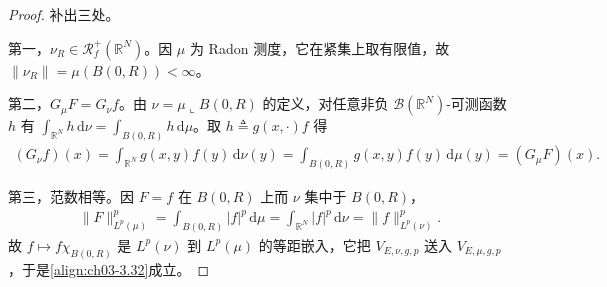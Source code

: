 \documentclass[../../main.tex]{subfiles}%
\begin{document}
\begin{proof}
补出三处。

第一，$\nu_R\in\mathscr{R}^+_f(\mathbb{R}^N)$。因 $\mu$ 为 Radon 测度，它在紧集上取有限值，故 $\|\nu_R\|=\mu(B(0,R))<\infty$。

第二，$G_\mu F=G_\nu f$。由 $\nu=\mu\llcorner B(0,R)$ 的定义，对任意非负 $\mathcal{B}(\mathbb{R}^N)$-可测函数 $h$ 有 $\int_{\mathbb{R}^N}h\,\mathrm{d}\nu=\int_{B(0,R)}h\,\mathrm{d}\mu$。取 $h\triangleq g(x,\cdot)f$ 得
\begin{align*}
(G_\nu f)(x)=\int_{\mathbb{R}^N}g(x,y)f(y)\,\mathrm{d}\nu(y)=\int_{B(0,R)}g(x,y)f(y)\,\mathrm{d}\mu(y)=(G_\mu F)(x).
\end{align*}

第三，范数相等。因 $F=f$ 在 $B(0,R)$ 上而 $\nu$ 集中于 $B(0,R)$，
\begin{align*}
\|F\|_{L^p(\mu)}^p=\int_{B(0,R)}|f|^p\,\mathrm{d}\mu=\int_{\mathbb{R}^N}|f|^p\,\mathrm{d}\nu=\|f\|_{L^p(\nu)}^p .
\end{align*}
故 $f\mapsto f\chi_{B(0,R)}$ 是 $L^p(\nu)$ 到 $L^p(\mu)$ 的等距嵌入，它把 $V_{E,\nu,g,p}$ 送入 $V_{E,\mu,g,p}$，于是\eqref{align:ch03-3.32}成立。
\end{proof}
\end{document}
